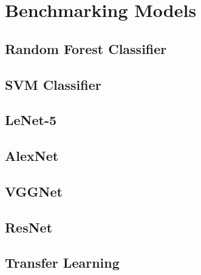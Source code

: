 \chapter{Benchmarking Models} \label{chap:benchmark}

\section{Random Forest Classifier}

\section{SVM Classifier}

\section{LeNet-5}

\section{AlexNet}

\section{VGGNet}

\section{ResNet}

\section{Transfer Learning}